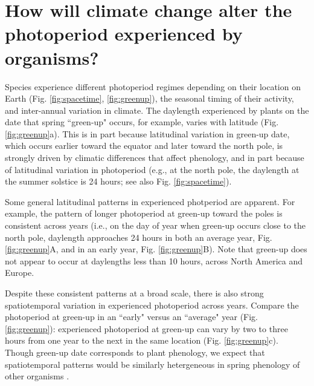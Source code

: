 \documentclass{article}
\begin{document}
\section*{How will climate change alter the photoperiod experienced by organisms?}
\par Species experience different photoperiod regimes depending on their location on Earth (Fig. \ref{fig:spacetime}, \ref{fig:greenup}), the seasonal timing of their activity, and inter-annual variation in climate. The daylength experienced by plants on the date that spring ``green-up" occurs, for example, varies with latitude (Fig. \ref{fig:greenup}a). This is in part because latitudinal variation in green-up date, which occurs earlier toward the equator and later toward the north pole, is strongly driven by climatic differences that affect phenology, and in part because of latitudinal variation in photoperiod (e.g., at the north pole, the daylength at the summer solstice is 24 hours; see also Fig. \ref{fig:spacetime}). 
\par Some general latitudinal patterns in experienced photperiod are apparent. For example, the pattern of longer photoperiod at green-up toward the poles is consistent across years (i.e., on the day of year when green-up occurs close to the north pole, daylength approaches 24 hours in both an average year, Fig. \ref{fig:greenup}A, and in an early year, Fig. \ref{fig:greenup}B). Note that green-up does not appear to occur at daylengths less than 10 hours, across North America and Europe. 
\par Despite these consistent patterns at a broad scale, there is also strong spatiotemporal variation in experienced photoperiod across years. Compare the photoperiod at green-up in an ``early" versus an ``average" year (Fig. \ref{fig:greenup}): experienced photoperiod at green-up can vary by two to three hours from one year to the next in the same location (Fig. \ref{fig:greenup}c). Though green-up date corresponds to plant phenology, we expect that spatiotemporal patterns would be similarly hetergeneous in spring phenology of other organisms \citep{ovaskainen2013, penuelas2002}.
\end{document}
